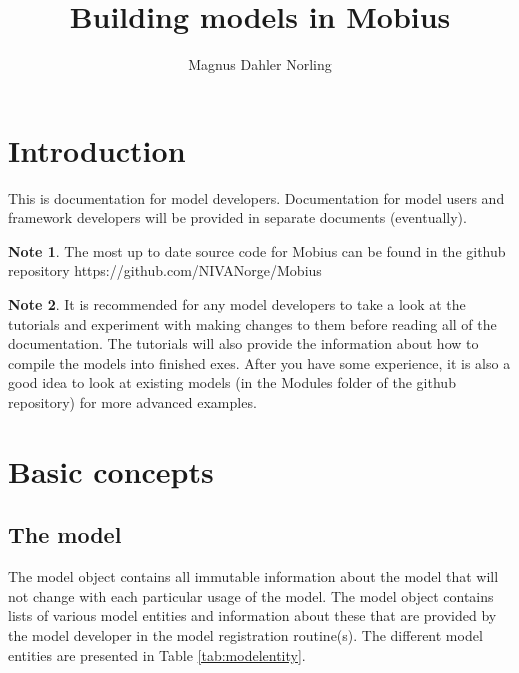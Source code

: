 \documentclass[11pt]{article}
\title{Building models in Mobius}
\author{Magnus Dahler Norling}
\theoremstyle{definition}
\newtheorem{mynote}{Note}
\newenvironment{note}%
  {\begin{lrbox}{\notebox}%
   \begin{minipage}{\dimexpr\linewidth-2\fboxsep}
   \begin{mynote}}%
  {\end{mynote}%
   \end{minipage}%
   \end{lrbox}%
   \begin{trivlist}
     \item[]\colorbox{silver}{\usebox\notebox}
   \end{trivlist}}
\begin{document}
\maketitle

\tableofcontents

\section{Introduction}
This is documentation for model developers. Documentation for model users and framework developers will be provided in separate documents (eventually).

\begin{note}
The most up to date source code for Mobius can be found in the github repository https://github.com/NIVANorge/Mobius
\end{note}

\begin{note}
It is recommended for any model developers to take a look at the tutorials and experiment with making changes to them before reading all of the documentation. The tutorials will also provide the information about how to compile the models into finished exes. After you have some experience, it is also a good idea to look at existing models (in the Modules folder of the github repository) for more advanced examples.
\end{note}

\section{Basic concepts}

\subsection{The model}

The model object contains all immutable information about the model that will not change with each particular usage of the model. The model object contains lists of various model entities and information about these that are provided by the model developer in the model registration routine(s). The different model entities are presented in Table \ref{tab:modelentity}.
\end{document}
